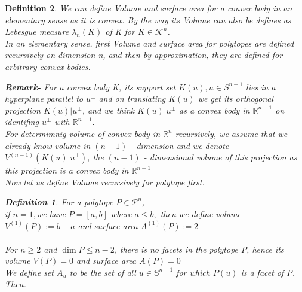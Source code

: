 \documentclass[oneside]{book}
\newtheorem{mydef}{Definition}
\begin{document}
\begin{mydef}
\normalfont

We can define Volume and surface area for a convex body in an elementary sense as it is convex. By the way its Volume can also be defines as Lebesgue measure $\lambda_{n}(K)$ of K  for $ K \in  \mathcal{K}^{n} $. \\
In an elementary sense, first Volume and surface area for polytopes are defined recursively on dimension n, and then by approximation, they are defined for arbitrary convex bodies. \newline

\textbf{Remark-} 
For a convex body  K, its support set $K(u),u \in S^{n-1} $ lies in a hyperplane parallel to 
$u^{\perp}$ and on translating $K(u)$ we get its orthogonal projection $K(u) | u^{\perp}$, and we think  $K(u) | u^{\perp}$ as a convex body in $\mathbb{R}^{n-1}$  on identifing $u^{\perp}$ with $\mathbb{R}^{n-1}$. \\
  For determimnig volume of convex body in $\mathbb{R}^{n}$ recursively, we assume that we already  know volume in $(n-1)$ - dimension and we denote $V^{(n-1)}\left(K(u) | u^{\perp}\right)$, the $(n-1)$ - dimensional volume of this projection as this projection is a convex body in $\mathbb{R}^{n-1}$ 
\\
Now let us define Volume recursively for polytope first. 

  \begin{mydef} \label{14}
For a polytope $P \in \mathcal{P}^{n}$,\\
if  $n=1,$we have  $P=[a, b]$ where $a \leq b,$ then we define volume $V^{(1)}(P):=b-a$ and  surface area $A^{(1)}(P):=2$ 
\\\\
  For  $ n \geq 2  $ and $\operatorname{dim} P \leq n-2$, there is no facets in the polytope $P$, hence its volume $V(P)=0$ and surface area $A(P)=0$ \\
  
 We define set $A_{{u}}$ to be the set of all $u \in \mathbb{S}^{n-1}$ for which $P(u)$ is a facet of P. Then. 


\end{mydef}
\end{mydef}
\end{document}
